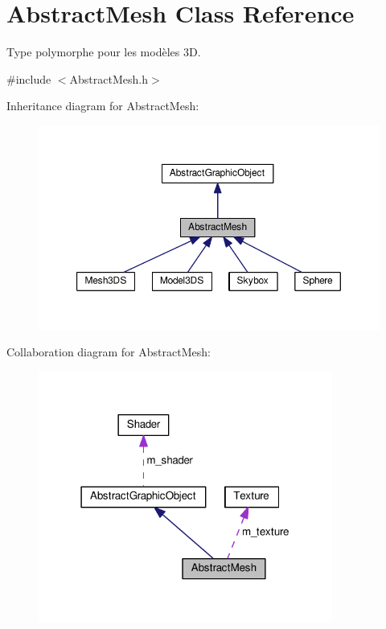 \hypertarget{classAbstractMesh}{\section{Abstract\+Mesh Class Reference}
\label{classAbstractMesh}
}


Type polymorphe pour les modèles 3\+D.  




{\ttfamily \#include $<$Abstract\+Mesh.\+h$>$}



Inheritance diagram for Abstract\+Mesh\+:\nopagebreak
\begin{figure}[H]
\begin{center}
\leavevmode
\includegraphics[width=350pt]{classAbstractMesh__inherit__graph}
\end{center}
\end{figure}


Collaboration diagram for Abstract\+Mesh\+:\nopagebreak
\begin{figure}[H]
\begin{center}
\leavevmode
\includegraphics[width=274pt]{classAbstractMesh__coll__graph}
\end{center}
\end{figure}
